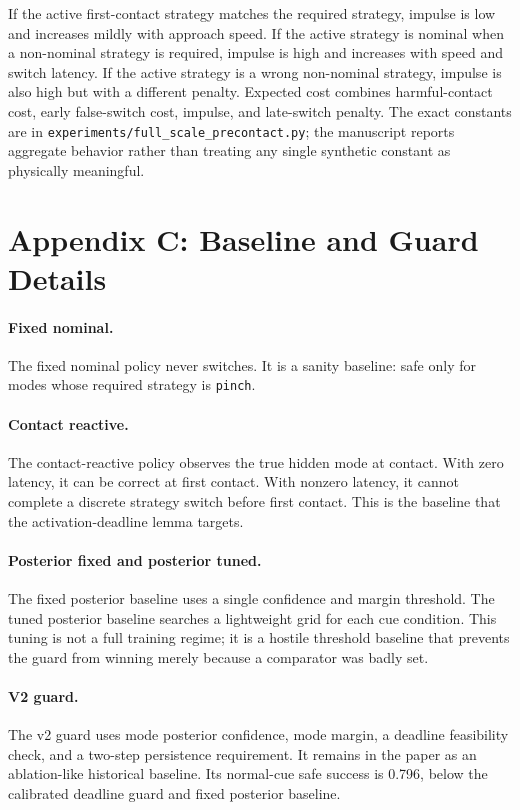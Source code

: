 \documentclass{article}
\begin{document}
If the active first-contact strategy matches the required strategy, impulse is low and increases mildly with approach speed. If the active strategy is nominal when a non-nominal strategy is required, impulse is high and increases with speed and switch latency. If the active strategy is a wrong non-nominal strategy, impulse is also high but with a different penalty. Expected cost combines harmful-contact cost, early false-switch cost, impulse, and late-switch penalty. The exact constants are in \texttt{experiments/full\_scale\_precontact.py}; the manuscript reports aggregate behavior rather than treating any single synthetic constant as physically meaningful.

\section{Appendix C: Baseline and Guard Details}

\paragraph{Fixed nominal.}
The fixed nominal policy never switches. It is a sanity baseline: safe only for modes whose required strategy is \texttt{pinch}.

\paragraph{Contact reactive.}
The contact-reactive policy observes the true hidden mode at contact. With zero latency, it can be correct at first contact. With nonzero latency, it cannot complete a discrete strategy switch before first contact. This is the baseline that the activation-deadline lemma targets.

\paragraph{Posterior fixed and posterior tuned.}
The fixed posterior baseline uses a single confidence and margin threshold. The tuned posterior baseline searches a lightweight grid for each cue condition. This tuning is not a full training regime; it is a hostile threshold baseline that prevents the guard from winning merely because a comparator was badly set.

\paragraph{V2 guard.}
The v2 guard uses mode posterior confidence, mode margin, a deadline feasibility check, and a two-step persistence requirement. It remains in the paper as an ablation-like historical baseline. Its normal-cue safe success is 0.796, below the calibrated deadline guard and fixed posterior baseline.
\end{document}
